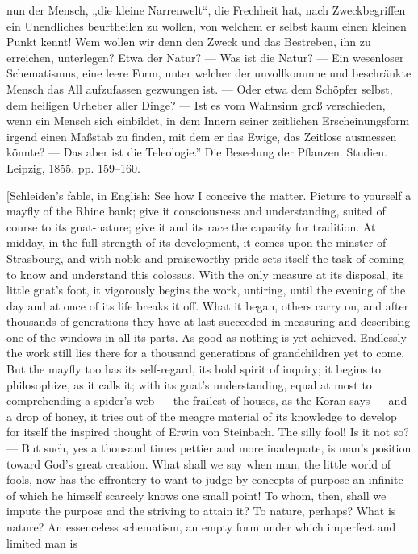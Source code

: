 \documentclass[12pt,a4paper]{book}
\begin{document}
{nun der Mensch, „die kleine Narrenwelt“, die Frechheit hat, nach Zweckbegriffen
ein Unendliches beurtheilen zu wollen, von welchem er selbst kaum einen kleinen
Punkt kennt! Wem wollen wir denn den Zweck und das Bestreben, ihn zu erreichen,
unterlegen? Etwa der Natur? --- Was ist die Natur? --- Ein wesenloser
Schematismus, eine leere Form, unter welcher der unvollkommne und beschränkte
Mensch das All aufzufassen gezwungen ist. --- Oder etwa dem Schöpfer selbst,
dem heiligen Urheber aller Dinge? --- Ist es vom Wahnsinn grcß verschieden,
wenn ein Mensch sich einbildet, in dem Innern seiner zeitlichen
Erscheinungsform irgend einen Maßstab zu finden, mit dem er das Ewige, das
Zeitlose ausmessen könnte? --- Das aber ist die Teleologie.'' Die Beseelung der
Pflanzen. Studien. Leipzig, 1855. pp. 159--160.
\par [Schleiden's fable, in English: See how I conceive the matter. Picture to
yourself a mayfly of the Rhine bank; give it consciousness and understanding,
suited of course to its gnat-nature; give it and its race the capacity for
tradition. At midday, in the full strength of its development, it comes upon the
minster of Strasbourg, and with noble and praiseworthy pride sets itself the task
of coming to know and understand this colossus. With the only measure at its
disposal, its little gnat's foot, it vigorously begins the work, untiring, until
the evening of the day and at once of its life breaks it off. What it began,
others carry on, and after thousands of generations they have at last succeeded
in measuring and describing one of the windows in all its parts. As good as
nothing is yet achieved. Endlessly the work still lies there for a thousand
generations of grandchildren yet to come. But the mayfly too has its
self-regard, its bold spirit of inquiry; it begins to philosophize, as it calls
it; with its gnat's understanding, equal at most to comprehending a spider's web
--- the frailest of houses, as the Koran says --- and a drop of honey, it tries
out of the meagre material of its knowledge to develop for itself the inspired
thought of Erwin von Steinbach. The silly fool! Is it not so? --- But such, yes a
thousand times pettier and more inadequate, is man's position toward God's great
creation. What shall we say when man, the little world of fools, now has the
effrontery to want to judge by concepts of purpose an infinite of which he
himself scarcely knows one small point! To whom, then, shall we impute the
purpose and the striving to attain it? To nature, perhaps? What is nature? An
essenceless schematism, an empty form under which imperfect and limited man is
}
\end{document}
